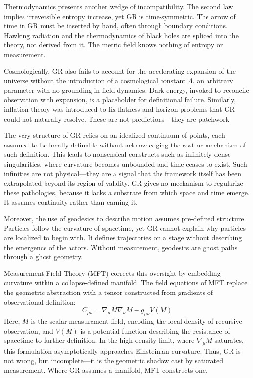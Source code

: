 Thermodynamics presents another wedge of incompatibility. The second law implies irreversible entropy increase, yet GR is time-symmetric. The arrow of time in GR must be inserted by hand, often through boundary conditions. Hawking radiation and the thermodynamics of black holes are spliced into the theory, not derived from it. The metric field knows nothing of entropy or measurement.

Cosmologically, GR also fails to account for the accelerating expansion of the universe without the introduction of a cosmological constant \(\Lambda\), an arbitrary parameter with no grounding in field dynamics. Dark energy, invoked to reconcile observation with expansion, is a placeholder for definitional failure. Similarly, inflation theory was introduced to fix flatness and horizon problems that GR could not naturally resolve. These are not predictions—they are patchwork.

The very structure of GR relies on an idealized continuum of points, each assumed to be locally definable without acknowledging the cost or mechanism of such definition. This leads to nonsensical constructs such as infinitely dense singularities, where curvature becomes unbounded and time ceases to exist. Such infinities are not physical—they are a signal that the framework itself has been extrapolated beyond its region of validity. GR gives no mechanism to regularize these pathologies, because it lacks a substrate from which space and time emerge. It assumes continuity rather than earning it.

Moreover, the use of geodesics to describe motion assumes pre-defined structure. Particles follow the curvature of spacetime, yet GR cannot explain why particles are localized to begin with. It defines trajectories on a stage without describing the emergence of the actors. Without measurement, geodesics are ghost paths through a ghost geometry.

Measurement Field Theory (MFT) corrects this oversight by embedding curvature within a collapse-defined manifold. The field equations of MFT replace the geometric abstraction with a tensor constructed from gradients of observational definition:
\[
C_{\mu\nu} = \nabla_\mu M \nabla_\nu M - g_{\mu\nu} V(M)
\]
Here, \(M\) is the scalar measurement field, encoding the local density of recursive observation, and \(V(M)\) is a potential function describing the resistance of spacetime to further definition. In the high-density limit, where \(\nabla_\mu M\) saturates, this formulation asymptotically approaches Einsteinian curvature. Thus, GR is not wrong, but incomplete—it is the geometric shadow cast by saturated measurement. Where GR assumes a manifold, MFT constructs one.

